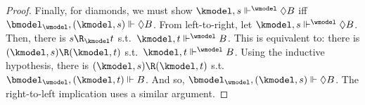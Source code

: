 \begin{proof}
  \medskip
  \noindent
  Finally, for diamonds, we must show $\kmodel, s \Vdash^{\wmodel} \Diamond B$ iff $\bmodel_{\wmodel}, (\kmodel,s) \Vdash \Diamond B$.
  From left-to-right, let $\kmodel, s \Vdash^{\wmodel} \Diamond B$.
  Then, there is $s \R_{\kmodel} t$ s.t.\ $\kmodel, t \Vdash^{\wmodel} B$.
  This is equivalent to: there is $(\kmodel, s) \R (\kmodel, t)$ s.t.\ $\kmodel, t \Vdash^{\wmodel} B$.
  Using the inductive hypothesis, there is $(\kmodel, s) \R (\kmodel, t)$ s.t.\ $\bmodel_{\wmodel}, (\kmodel, t) \Vdash B$.
  And so, $\bmodel_{\wmodel}, (\kmodel, s) \Vdash \Diamond B$.
  The right-to-left implication uses a similar argument.
\end{proof}

